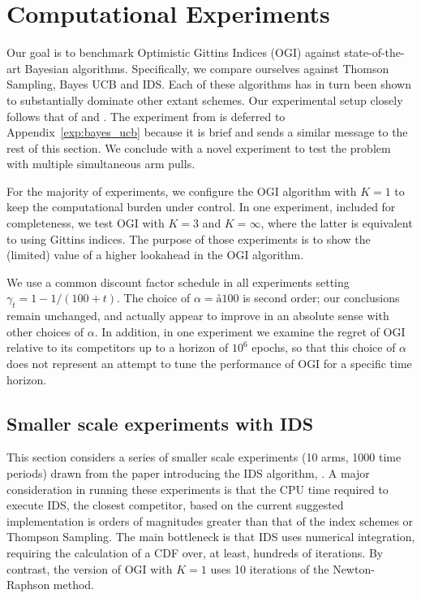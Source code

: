\section{Computational Experiments} \label{sec:experiments}
Our goal is to benchmark Optimistic Gittins Indices (OGI) against state-of-the-art Bayesian algorithms. Specifically, we compare ourselves against Thomson Sampling, Bayes UCB and IDS. Each of these algorithms has in turn been shown to substantially dominate other extant schemes. Our experimental setup closely follows that of \cite{russo2014learning,kaufmann2012bayesian} and \cite{chapelle2011empirical}. 
The experiment from \cite{kaufmann2012bayesian} is deferred to Appendix~\ref{exp:bayes_ucb} because it is brief and sends a similar message to the rest of this section. We conclude with a novel experiment to test the problem with multiple simultaneous arm pulls.

For the majority of experiments, we configure the OGI algorithm with $K =1$ to keep the computational burden under control. In one experiment, included for completeness, we test OGI with $K = 3$ and $K=\infty$, where the latter is equivalent to using Gittins indices. The purpose of those experiments is to show the (limited) value of a higher lookahead in the OGI algorithm. 

We use a common discount factor schedule in all experiments setting $\gamma_t = 1 - 1/(100 + t)$. The choice of $\alpha =å 100$ is second order; our conclusions remain unchanged, and actually appear to improve in an absolute sense with other choices of $\alpha$. In addition, in one experiment we examine the regret of OGI relative to its competitors up to a horizon of $10^6$ epochs, so that this choice of $\alpha$ does not represent an attempt to tune the performance of OGI for a specific time horizon. 



\subsection{Smaller scale experiments with IDS}

This section considers a series of smaller scale experiments (10 arms, 1000 time periods) drawn from the paper introducing the IDS algorithm, \citep{russo2014learning}. A major consideration in running these experiments is that the CPU time required to execute IDS, the closest competitor, based on the current suggested implementation is orders of magnitudes greater than that of the index schemes or Thompson Sampling. The main bottleneck is that IDS uses numerical integration, requiring the calculation of a CDF over, at least, hundreds of iterations. By contrast, the version of OGI with $K=1$ uses 10 iterations of the Newton-Raphson method. 

